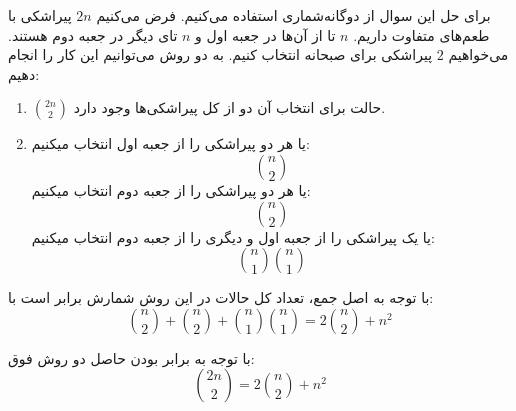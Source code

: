 \p
برای حل این سوال از دوگانه‌شماری استفاده می‌کنیم. فرض می‌کنیم 
$2n$
پیراشکی با طعم‌های متفاوت داریم.
$n$
تا از آن‌ها در جعبه اول و 
$n$
تای دیگر در جعبه دوم هستند. می‌خواهیم 
$2$
پیراشکی برای صبحانه انتخاب کنیم. به دو روش می‌توانیم این کار را انجام دهیم:
\begin{enumerate}
\item
$\binom{2n}{2}$
حالت برای انتخاب آن دو از کل پیراشکی‌ها وجود دارد.
\item
یا هر دو پیراشکی را از جعبه اول انتخاب میکنیم:
$$\binom{n}{2}$$
یا هر دو پیراشکی را از جعبه دوم انتخاب میکنیم:
$$\binom{n}{2}$$
یا یک پیراشکی را از جعبه اول و دیگری را از جعبه دوم انتخاب میکنیم:
$$\binom{n}{1}\binom{n}{1}$$
\end{enumerate}
با توجه به اصل جمع، تعداد کل حالات در این روش شمارش برابر است با:
$$\binom{n}{2} + \binom{n}{2} + \binom{n}{1}\binom{n}{1} = 2\binom{n}{2} + n^2$$

\p
با توجه به برابر بودن حاصل دو روش فوق:
$$\binom{2n}{2} = 2\binom{n}{2} + n^2$$